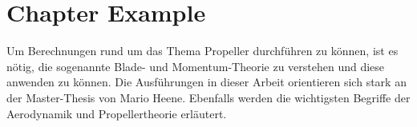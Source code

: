 \section{Chapter Example}
\label{sec:chapterexample}


Um Berechnungen rund um das Thema Propeller durchführen zu können, ist es nötig, die sogenannte Blade- und Momentum-Theorie zu verstehen und diese anwenden zu können. Die Ausführungen in dieser Arbeit orientieren sich stark an der Master-Thesis von Mario Heene\cite{heene}. Ebenfalls werden die wichtigsten Begriffe der Aerodynamik und Propellertheorie erläutert. 